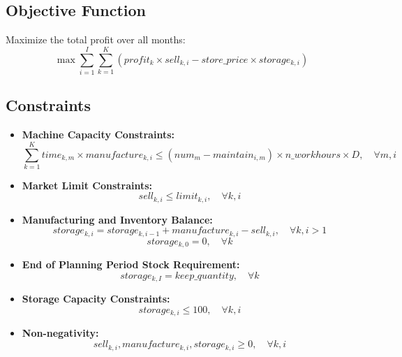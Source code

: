 \documentclass{article}
\begin{document}
\subsection*{Objective Function}
Maximize the total profit over all months:
\[
\max \sum_{i=1}^{I} \sum_{k=1}^{K} \left( profit_k \times sell_{k, i} - store\_price \times storage_{k, i} \right)
\]

\subsection*{Constraints}
\begin{itemize}
    \item \textbf{Machine Capacity Constraints:}
    \[
    \sum_{k=1}^{K} time_{k, m} \times manufacture_{k, i} \leq \left(num_{m} - maintain_{i, m}\right) \times n\_workhours \times D, \quad \forall m, i
    \]
    
    \item \textbf{Market Limit Constraints:}
    \[
    sell_{k, i} \leq limit_{k, i}, \quad \forall k, i
    \]
    
    \item \textbf{Manufacturing and Inventory Balance:}
    \[
    storage_{k, i} = storage_{k, i-1} + manufacture_{k, i} - sell_{k, i}, \quad \forall k, i > 1
    \]
    \[
    storage_{k, 0} = 0, \quad \forall k
    \]
    
    \item \textbf{End of Planning Period Stock Requirement:}
    \[
    storage_{k, I} = keep\_quantity, \quad \forall k
    \]
    
    \item \textbf{Storage Capacity Constraints:}
    \[
    storage_{k, i} \leq 100, \quad \forall k, i
    \]
    
    \item \textbf{Non-negativity:}
    \[
    sell_{k, i}, manufacture_{k, i}, storage_{k, i} \geq 0, \quad \forall k, i
    \]
\end{itemize}
\end{document}
